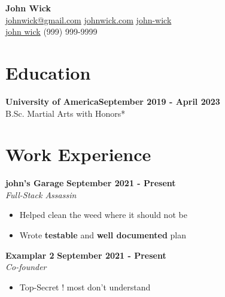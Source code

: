\documentclass[letterpaper, 11pt]{article}
\newcommand{\iconSpace}{\hspace{1px}}
\newcommand{\bulletSpace}{\vspace{-8pt}}
\newcommand{\hSpace}{\hspace{8px}}
\newcommand{\secStartSpace}{\vspace{3pt}}
\newcommand{\secEndSpace}{\vspace{5pt}}
\newcommand{\spaceCollapse}{\vspace{-5pt}}
\newcommand{\workHeader}[3]{
\noindent \textbf{#1} \hfill \textbf{#3}\\
	\textit{#2}
}
\begin{document}
\begin{center} 
	{\Large \textbf{John Wick}}\\
	\vspace{1px}
	{\footnotesize
		 \href{mailto:john@wick.com}{johnwick@gmail.com} 
		\hSpace
		 \iconSpace \href{johnwick.com}{johnwick.com} 
		\hSpace 
		 \hspace{.1px} \href{https://www.linkedin.com/in/john-wick/}{john-wick} 
		\hSpace
		}\\
	{\footnotesize
		 \iconSpace \href{https://github.com/john-wick}{john wick}
		\hSpace 
		 \iconSpace
		(999) 999-9999
	}
\end{center}
\spaceCollapse


\section{\color{red} \textbf{Education}}
\secStartSpace

\begin{addmargin}[1em]{1em}
	\textbf{University of America}\hfill \textbf{September 2019 - April 2023}\\
	\setlength\parindent{1cm} B.Sc. Martial Arts with Honors*
\end{addmargin}
\secEndSpace


\section{\color{red} \textbf{Work Experience}}
\secStartSpace

\begin{addmargin}[1em]{1em}
		
	\noindent \textbf{john's Garage} \hfill \textbf{September 2021 - Present}\\
	\textit{Full-Stack Assassin}
	\spaceCollapse
	\begin{itemize}
		\item Helped clean the weed where it should not be
		      \bulletSpace
		\item Wrote \textbf{testable} and \textbf{well documented} plan
	\end{itemize}
		
	\workHeader{Examplar 2}{Co-founder}{September 2021 - Present} 
	\spaceCollapse
	\begin{itemize}
		\item Top-Secret ! most don't understand
	\end{itemize}
\end{addmargin}
\secEndSpace
\end{document}
